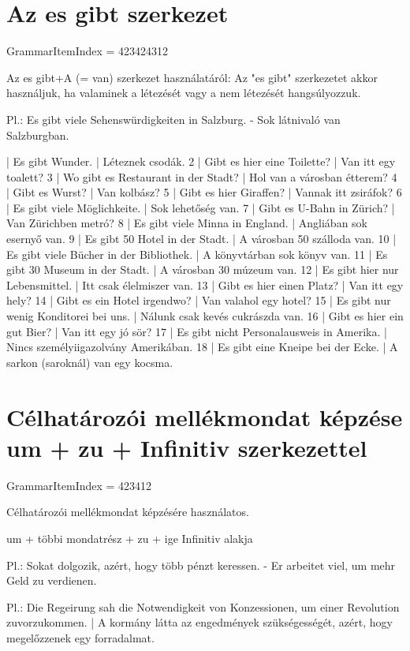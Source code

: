 \documentclass{article}
\newenvironment{desc}{\verbatim}{\endverbatim}
\newenvironment{exmp}{\verbatim}{\endverbatim}
\begin{document}
\section{Az es gibt szerkezet}

GrammarItemIndex = 423424312

\begin{desc}
Az es gibt+A (= van) szerkezet használatáról: Az "es gibt" szerkezetet akkor használjuk, ha valaminek a létezését vagy a nem létezését hangsúlyozzuk.

Pl.: Es gibt viele Sehenswürdigkeiten in Salzburg. - Sok látnivaló van Salzburgban.
\end{desc}

\begin{exmp}
1 | Es gibt Wunder. | Léteznek csodák.
2 | Gibt es hier eine Toilette? | Van itt egy toalett?
3 | Wo gibt es Restaurant in der Stadt? | Hol van a városban étterem?
4 | Gibt es Wurst? | Van kolbász?
5 | Gibt es hier Giraffen? | Vannak itt zsiráfok?
6 | Es gibt viele Möglichkeite. | Sok lehetőség van.
7 | Gibt es U-Bahn in Zürich? | Van Zürichben metró?
8 | Es gibt viele Minna in England. | Angliában sok esernyő van.
9 | Es gibt 50 Hotel in der Stadt. | A városban 50 szálloda van.
10 | Es gibt viele Bücher in der Bibliothek. | A könyvtárban sok könyv van.
11 | Es gibt 30 Museum in der Stadt. | A városban 30 múzeum van.
12 | Es gibt hier nur Lebensmittel. | Itt csak élelmiszer van.
13 | Gibt es hier einen Platz? | Van itt egy hely?
14 | Gibt es ein Hotel irgendwo? | Van valahol egy hotel?
15 | Es gibt nur wenig Konditorei bei uns. | Nálunk csak kevés cukrászda van.
16 | Gibt es hier ein gut Bier? | Van itt egy jó sör?
17 | Es gibt nicht Personalausweis in Amerika. | Nincs személyiigazolvány Amerikában.
18 | Es gibt eine Kneipe bei der Ecke. | A sarkon (saroknál) van egy kocsma.
\end{exmp}

\section{Célhatározói mellékmondat képzése um + zu + Infinitiv szerkezettel}

GrammarItemIndex = 423412

\begin{desc}
Célhatározói mellékmondat képzésére használatos.

um + többi mondatrész + zu + ige Infinitiv alakja

Pl.: Sokat dolgozik, azért, hogy több pénzt keressen. - Er arbeitet viel, um mehr Geld zu verdienen.

Pl.: Die Regeirung sah die Notwendigkeit von Konzessionen, um einer Revolution zuvorzukommen. | A kormány látta az engedmények szükségességét, azért, hogy megelőzzenek egy forradalmat.
\end{desc}
\end{document}
